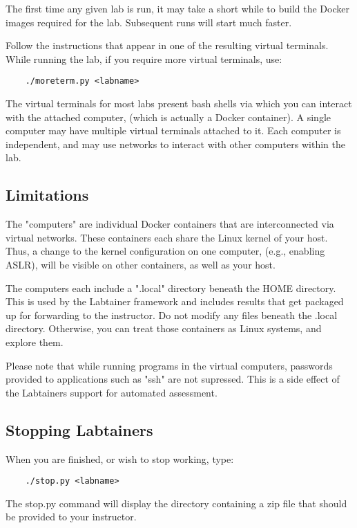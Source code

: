 \documentclass{article}
\begin{document}
The first time any given lab is run, it may take a short while to build the Docker images 
required for the lab.  Subsequent runs will start much faster.

Follow the instructions that appear in one of the resulting virtual terminals.
While running the lab, if you require more virtual terminals, use:
\begin{verbatim}
    ./moreterm.py <labname>
\end{verbatim}

The virtual terminals for most labs present bash shells via which you can interact
with the attached computer, (which is actually a Docker container).  A single computer
may have multiple virtual terminals attached to it.  Each computer is independent, and 
may use networks to interact with other computers within the lab.  

\subsection{Limitations}
The "computers" are individual Docker containers that are interconnected via virtual
networks.  These containers each share the Linux kernel of your host.  Thus, a change
to the kernel configuration on one computer, (e.g., enabling ASLR), will be visible on
other containers, as well as your host.

The computers each include a ".local" directory beneath the HOME directory.  This is used
by the Labtainer framework and includes results that get packaged up for forwarding to the
instructor.  Do not modify any files beneath the .local directory.  Otherwise, you can treat
those containers as Linux systems, and explore them.

Please note that while running programs in the virtual computers, passwords provided to
applications such as "ssh" are not supressed.  This is a side effect of the Labtainers
support for automated assessment.

\subsection{Stopping Labtainers}
When you are finished, or wish to stop working, type:
\begin{verbatim}
    ./stop.py <labname>
\end{verbatim}
The stop.py command will display the directory containing a zip file that should be provided to your instructor.

\newpage
\appendix 
\end{document}
